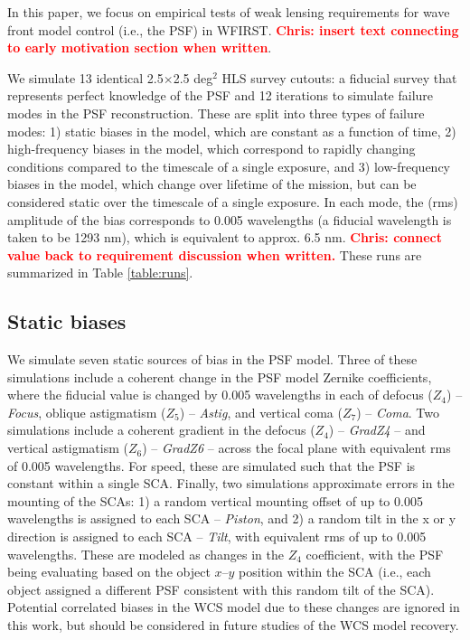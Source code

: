\documentclass[aps,prd, amsmath,amssymb,superscriptaddress,showkeys,nofootinbib,reprint,preprintnumbers]{revtex4-1}
\newcommand{\verify}[1]{\textcolor{red}{\textbf{{#1}}}}
\begin{document}
In this paper, we focus on empirical tests of weak lensing requirements for wave front model control (i.e., the PSF) in WFIRST. \verify{Chris: insert text connecting to early motivation section when written}. 

We simulate 13 identical 2.5$\times$2.5 deg$^2$ HLS survey cutouts: a fiducial survey that represents perfect knowledge of the PSF and 12 iterations to simulate failure modes in the PSF reconstruction. 
These are split into three types of failure modes: 1) static biases in the model, which are constant as a function of time, 2) high-frequency biases in the model, which correspond to rapidly changing conditions compared to the timescale of a single exposure, and 3) low-frequency biases in the model, which change over lifetime of the mission, but can be considered static over the timescale of a single exposure. 
In each mode, the (rms) amplitude of the bias corresponds to 0.005 wavelengths (a fiducial wavelength is taken to be 1293 nm), which is equivalent to approx. 6.5 nm. 
\verify{Chris: connect value back to requirement discussion when written.} These runs are summarized in Table \ref{table:runs}.

\subsection{Static biases}\label{sec:static}

We simulate seven static sources of bias in the PSF model. 
Three of these simulations include a coherent change in the PSF model Zernike coefficients, where the fiducial value is changed by 0.005 wavelengths in each of defocus ($Z_4$) -- \emph{Focus}, oblique astigmatism ($Z_5$) -- \emph{Astig}, and vertical coma ($Z_7$) -- \emph{Coma}. 
Two simulations include a coherent gradient in the defocus ($Z_4$) -- \emph{GradZ4} -- and vertical astigmatism ($Z_6$) -- \emph{GradZ6} -- across the focal plane with equivalent rms of 0.005 wavelengths. 
For speed, these are simulated such that the PSF is constant within a single SCA. Finally, two simulations approximate errors in the mounting of the SCAs: 1) a random vertical mounting offset of up to 0.005 wavelengths is assigned to each SCA  -- \emph{Piston}, and 2) a random tilt in the x or y direction is assigned to each SCA  -- \emph{Tilt}, with equivalent rms of up to 0.005 wavelengths. 
These are modeled as changes in the $Z_4$ coefficient, with the PSF being evaluating based on the object $x$--$y$ position within the SCA (i.e., each object assigned a different PSF consistent with this random tilt of the SCA). 
Potential correlated biases in the WCS model due to these changes are ignored in this work, but should be considered in future studies of the WCS model recovery.
\end{document}
